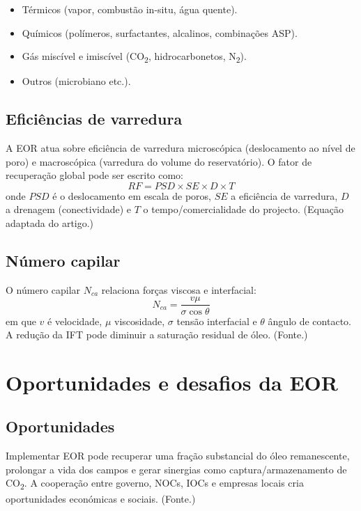 \documentclass[11pt,a4paper]{article}
\begin{document}
\begin{itemize}[noitemsep]
  \item Térmicos (vapor, combustão in-situ, água quente).
  \item Químicos (polímeros, surfactantes, alcalinos, combinações ASP).
  \item Gás miscível e imiscível (CO\textsubscript{2}, hidrocarbonetos, N\textsubscript{2}).
  \item Outros (microbiano etc.).
\end{itemize}

\subsection{Eficiências de varredura}
A EOR atua sobre eficiência de varredura microscópica (deslocamento ao nível de poro) e macroscópica (varredura do volume do reservatório). O fator de recuperação global pode ser escrito como:
\begin{equation}
RF = PSD \times SE \times D \times T
\end{equation}
onde $PSD$ é o deslocamento em escala de poros, $SE$ a eficiência de varredura, $D$ a drenagem (conectividade) e $T$ o tempo/comercialidade do projecto. (Equação adaptada do artigo.)

\subsection{Número capilar}
O número capilar $N_{ca}$ relaciona forças viscosa e interfacial:
\begin{equation}
N_{ca} = \frac{v \mu}{\sigma \cos\theta}
\end{equation}
em que $v$ é velocidade, $\mu$ viscosidade, $\sigma$ tensão interfacial e $\theta$ ângulo de contacto. A redução da IFT pode diminuir a saturação residual de óleo. (Fonte.)

\section{Oportunidades e desafios da EOR}
\subsection{Oportunidades}
Implementar EOR pode recuperar uma fração substancial do óleo remanescente, prolongar a vida dos campos e gerar sinergias como captura/armazenamento de CO\textsubscript{2}. A cooperação entre governo, NOCs, IOCs e empresas locais cria oportunidades económicas e sociais. (Fonte.)
\end{document}
